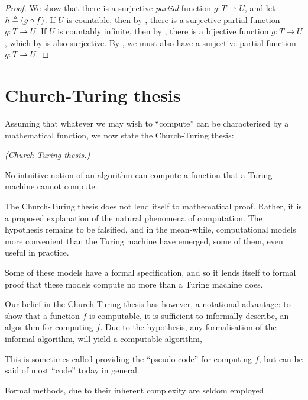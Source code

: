 \begin{proof} We show that there is a surjective \emph{partial} function $g : T
\rightharpoonup U$, and let $h \triangleq \mathopen{}\left({g \circ f}\right)\mathclose{}$. If $U$ is countable,
then by , there is a surjective partial
function $g : T \rightharpoonup U$. If $U$ is countably infinite, then by
, there is a bijective
function $g : T \rightarrow U$, which by  is also surjective.
By , we must also have a surjective partial function
$g : T \rightharpoonup U$.\end{proof}


\section{Church-Turing thesis}

Assuming that whatever we may wish to ``compute'' can be characterised by a
mathematical function, we now state the Church-Turing thesis:

\begin{hypothesis} \textit{(Church-Turing thesis.)}

No intuitive notion of an algorithm can compute a function that a Turing
machine cannot compute.

\end{hypothesis}

The Church-Turing thesis does not lend itself to mathematical proof. Rather, it
is a proposed explanation of the natural phenomena of computation. The
hypothesis remains to be falsified, and in the mean-while, computational models
more convenient than the Turing machine have emerged, some of them, even useful
in practice.

Some of these models have a formal specification, and so it lends itself to
formal proof that these models compute no more than a Turing machine does.

Our belief in the Church-Turing thesis has however, a notational advantage: to
show that a function $f$ is computable, it is sufficient to informally
describe, an algorithm for computing $f$. Due to the hypothesis, any
formalisation of the informal algorithm, will yield a computable algorithm,

This is sometimes called providing the ``pseudo-code'' for computing $f$, but can be said
of most ``code'' today in general.

Formal methods, due to their inherent complexity are seldom employed.


